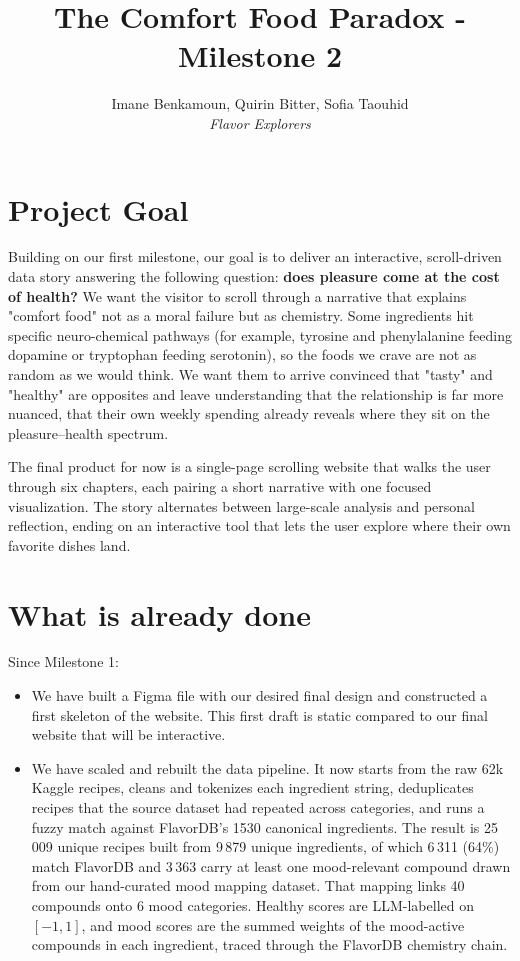 \documentclass[10pt,conference,compsocconf]{IEEEtran}
\begin{document}
\title{The Comfort Food Paradox - Milestone 2}

\author{
  Imane Benkamoun, Quirin Bitter, Sofia Taouhid\\
  \textit{Flavor Explorers}
}

\maketitle

\section{Project Goal}

Building on our first milestone, our goal is to deliver an interactive, scroll-driven data story answering the following question: \textbf{does pleasure come at the cost of health?} We want the visitor to scroll through a narrative that explains "comfort food" not as a moral failure but as chemistry. Some ingredients hit specific neuro-chemical pathways (for example, tyrosine and phenylalanine feeding dopamine or tryptophan feeding serotonin), so the foods we crave are not as random as we would think. We want them to arrive convinced that "tasty" and "healthy" are opposites and leave understanding that the relationship is far more nuanced, that their own weekly spending already reveals where they sit on the pleasure–health spectrum. 

The final product for now is a single-page scrolling website that walks the user through six chapters, each pairing a short narrative with one focused visualization. The story alternates between large-scale analysis and personal reflection, ending on an interactive tool that lets the user explore where their own favorite dishes land.

\section{What is already done}
Since Milestone 1:

\begin{itemize}
    \item We have built a Figma file with our desired final design and constructed a first skeleton of the website. This first draft is static compared to our final website that will be interactive.
    \item We have scaled and rebuilt the data pipeline. It now starts from the raw 62k Kaggle recipes, cleans and tokenizes each ingredient string, deduplicates recipes that the source dataset had repeated across categories, and runs a fuzzy match against FlavorDB's 1530 canonical ingredients. The result is 25\,009 unique recipes built from 9\,879 unique ingredients, of which 6\,311 (64\%) match FlavorDB and 3\,363 carry at least one mood-relevant compound drawn from our hand-curated mood mapping dataset. That mapping links 40 compounds onto 6 mood categories. Healthy scores are LLM-labelled on $[-1, 1]$, and mood scores are the summed weights of the mood-active compounds in each ingredient, traced through the FlavorDB chemistry chain. 
\end{itemize}
\end{document}
